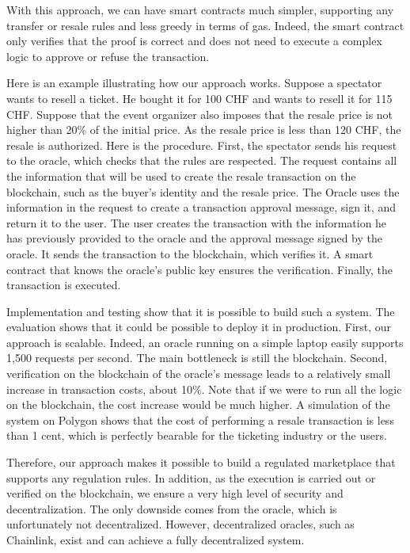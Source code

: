 \documentclass[a4paper,11pt,oneside]{report}
\begin{document}
With this approach, we can have smart contracts much simpler, supporting any transfer or resale rules and less greedy in terms of gas. Indeed, the smart contract only verifies that the proof is correct and does not need to execute a complex logic to approve or refuse the transaction.

Here is an example illustrating how our approach works. Suppose a spectator wants to resell a ticket. He bought it for 100 CHF and wants to resell it for 115 CHF. Suppose that the event organizer also imposes that the resale price is not higher than 20\% of the initial price. As the resale price is less than 120 CHF, the resale is authorized. Here is the procedure. First, the spectator sends his request to the oracle, which checks that the rules are respected. The request contains all the information that will be used to create the resale transaction on the blockchain, such as the buyer's identity and the resale price. The Oracle uses the information in the request to create a transaction approval message, sign it, and return it to the user. The user creates the transaction with the information he has previously provided to the oracle and the approval message signed by the oracle. It sends the transaction to the blockchain, which verifies it. A smart contract that knows the oracle's public key ensures the verification. Finally, the transaction is executed.

Implementation and testing show that it is possible to build such a system. The evaluation shows that it could be possible to deploy it in production. First, our approach is scalable. Indeed, an oracle running on a simple laptop easily supports 1,500 requests per second. The main bottleneck is still the blockchain. Second, verification on the blockchain of the oracle's message leads to a relatively small increase in transaction costs, about 10\%. Note that if we were to run all the logic on the blockchain, the cost increase would be much higher. A simulation of the system on Polygon shows that the cost of performing a resale transaction is less than 1 cent, which is perfectly bearable for the ticketing industry or the users.

Therefore, our approach makes it possible to build a regulated marketplace that supports any regulation rules. In addition, as the execution is carried out or verified on the blockchain, we ensure a very high level of security and decentralization. The only downside comes from the oracle, which is unfortunately not decentralized. However, decentralized oracles, such as Chainlink, exist and can achieve a fully decentralized system.
\end{document}
